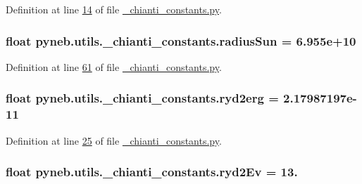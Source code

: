 Definition at line \hyperlink{__chianti__constants_8py_source_l00014}{14} of file \hyperlink{__chianti__constants_8py_source}{\-\_\-chianti\-\_\-constants.\-py}.

\hypertarget{namespacepyneb_1_1utils_1_1__chianti__constants_a0be81c3c0c21d1da41888ce98b5d6d1f}{
\subsubsection[{radius\-Sun}]{\setlength{\rightskip}{0pt plus 5cm}float pyneb.\-utils.\-\_\-chianti\-\_\-constants.\-radius\-Sun = 6.\-955e+10}}\label{namespacepyneb_1_1utils_1_1__chianti__constants_a0be81c3c0c21d1da41888ce98b5d6d1f}


Definition at line \hyperlink{__chianti__constants_8py_source_l00061}{61} of file \hyperlink{__chianti__constants_8py_source}{\-\_\-chianti\-\_\-constants.\-py}.

\hypertarget{namespacepyneb_1_1utils_1_1__chianti__constants_ad7625b518e82737e16e875fefc1d7946}{
\subsubsection[{ryd2erg}]{\setlength{\rightskip}{0pt plus 5cm}float pyneb.\-utils.\-\_\-chianti\-\_\-constants.\-ryd2erg = 2.\-17987197e-\/11}}\label{namespacepyneb_1_1utils_1_1__chianti__constants_ad7625b518e82737e16e875fefc1d7946}


Definition at line \hyperlink{__chianti__constants_8py_source_l00025}{25} of file \hyperlink{__chianti__constants_8py_source}{\-\_\-chianti\-\_\-constants.\-py}.

\hypertarget{namespacepyneb_1_1utils_1_1__chianti__constants_a32597fdc8de3dac5d1876cfab6a3dbd1}{
\subsubsection[{ryd2\-Ev}]{\setlength{\rightskip}{0pt plus 5cm}float pyneb.\-utils.\-\_\-chianti\-\_\-constants.\-ryd2\-Ev = 13.}}\label{namespacepyneb_1_1utils_1_1__chianti__constants_a32597fdc8de3dac5d1876cfab6a3dbd1}


